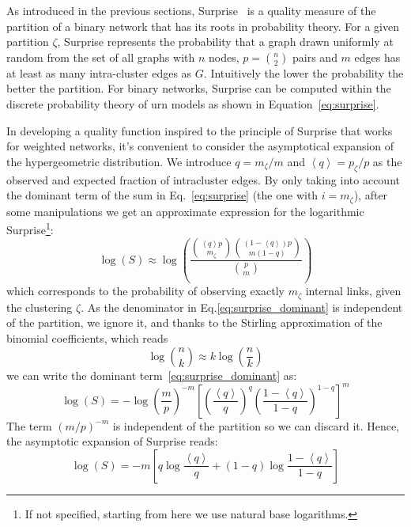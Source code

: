 As introduced in the previous sections, Surprise~\cite{aldecoa2011,aldecoa2013} is a quality measure of the partition of a binary network that has its roots in probability theory.
For a given partition $\zeta$, Surprise represents the probability that a graph drawn uniformly at random from the set of all graphs with $n$ nodes, $p=\binom{n}{2}$ pairs and $m$ edges has at least as many intra-cluster edges as $G$.
Intuitively the lower the probability the better the partition.
For binary networks, Surprise can be computed within the discrete probability theory of urn models as shown in Equation~\ref{eq:surprise}.

In developing a quality function inspired to the principle of Surprise that works for weighted networks, it's convenient to consider the asymptotical expansion of the hypergeometric distribution. We introduce  $q=m_\zeta/m$ and $\left<q \right>=p_\zeta/p$ as the observed and expected fraction of intracluster edges. By only taking into account the dominant term of the sum in Eq.~\ref{eq:surprise} (the one with $i=m_\zeta$), after some manipulations we get an approximate expression for the logarithmic Surprise\footnote{If not specified, starting from here we use natural base logarithms.}:
\begin{equation}\label{eq:surprise_dominant}
\log(S) \approx \log \left( \frac{\binom{\left<q\right> p}{m_\zeta} \binom{(1-\left<q\right>)p}{m(1-q)}}{\binom{p}{m}} \right)
\end{equation}
which corresponds to the probability of observing exactly $m_\zeta$ internal links, given the clustering $\zeta$. As the denominator in Eq.\ref{eq:surprise_dominant} is independent of the partition, we ignore it, and thanks to the Stirling approximation of the binomial coefficients, which reads 
\begin{equation}
\log \binom{n}{k} \approx k \log \left( \frac{n}{k} \right)
\end{equation}
we can write the dominant term~\ref{eq:surprise_dominant} as:
\begin{equation}
\log(S) = - \log \left(\frac{m}{p}\right)^{-m} \left[ \left(\frac{\left< q\right>}{q}\right)^q \left(\frac{1-\left< q\right>}{1-q}\right)^{1-q} \right]^{m}
\end{equation}
The term $(m/p)^{-m}$ is independent of the partition so we can discard it. Hence, the asymptotic expansion of Surprise reads:
\begin{equation}
\log(S) = -m \left[ q \log \frac{\left<q\right>}{q} + (1-q)\log \frac{1-\left<q\right>}{1-q} \right]
\end{equation}
